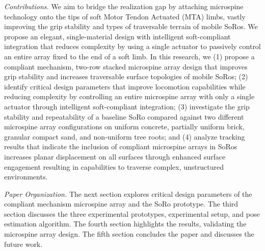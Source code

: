 

\textit{Contributions.} We aim to bridge the realization gap by attaching microspine technology onto the tips of soft Motor Tendon Actuated (MTA) limbs, vastly improving the grip stability and types of traversable terrain of mobile SoRos.  We propose an elegant, single-material design with intelligent soft-compliant integration that reduces complexity by using a single actuator to passively control an entire array fixed to the end of a soft limb. In this research, we 
(1) propose a compliant mechanism, two-row stacked microspine array design that improves grip stability and increases traversable surface topologies of mobile SoRos;
(2) identify critical design parameters that improve locomotion capabilities while reducing complexity by controlling an entire microspine array with only a single actuator through intelligent soft-compliant integration;
(3) investigate the grip stability and repeatability of a baseline SoRo compared against two different microspine array configurations on uniform concrete, partially uniform brick, granular compact sand, and non-uniform tree roots; and
(4) analyze tracking results that indicate the inclusion of compliant microspine arrays in SoRos increases planar displacement on all surfaces through enhanced surface engagement resulting in capabilities to traverse complex, unstructured environments.

\textit{Paper Organization.} The next section explores critical design parameters of the compliant mechanism microspine array and the SoRo prototype. The third section discusses the three experimental prototypes, experimental setup, and pose estimation algorithm. The fourth section highlights the results, validating the microspine array design. The fifth section concludes the paper and discusses the future work.
